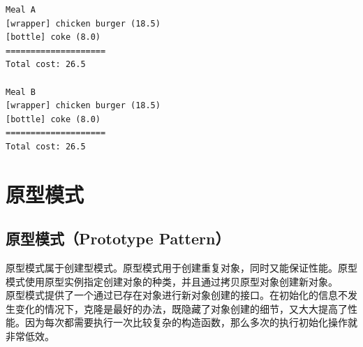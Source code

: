 \begin{tcolorbox}
    \begin{verbatim}
Meal A
[wrapper] chicken burger (18.5)
[bottle] coke (8.0)
====================
Total cost: 26.5

Meal B
[wrapper] chicken burger (18.5)
[bottle] coke (8.0)
====================
Total cost: 26.5
\end{verbatim}
\end{tcolorbox}

\newpage

\section{原型模式}

\subsection{原型模式（Prototype Pattern）}

原型模式属于创建型模式。原型模式用于创建重复对象，同时又能保证性能。原型模式使用原型实例指定创建对象的种类，并且通过拷贝原型对象创建新对象。\\

原型模式提供了一个通过已存在对象进行新对象创建的接口。在初始化的信息不发生变化的情况下，克隆是最好的办法，既隐藏了对象创建的细节，又大大提高了性能。因为每次都需要执行一次比较复杂的构造函数，那么多次的执行初始化操作就非常低效。\\

\\

